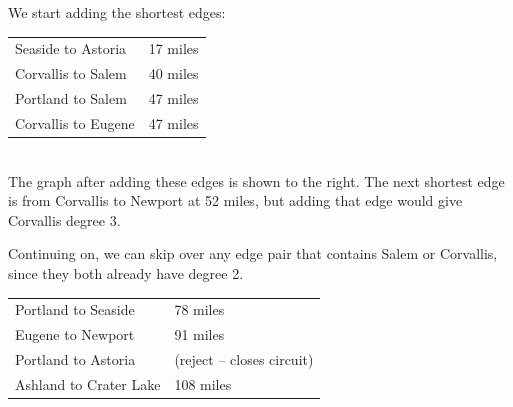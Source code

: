 \begin{example}{}
\begin{minipage}{0.5\textwidth}
We start adding the shortest edges:\\
\begin{tabular}{ll}
Seaside to Astoria&	17 miles\\
Corvallis to Salem	&40 miles\\
Portland to Salem	&47 miles\\
Corvallis to Eugene	&47 miles\\
\end{tabular}\\

The graph after adding these edges is shown to the right.   The next shortest edge is from Corvallis to Newport at 52 miles, but adding that edge would give Corvallis degree 3.  \\
\end{minipage}
%
\begin{minipage}{0.5\textwidth}
\end{minipage}

\begin{minipage}{0.5\textwidth}
Continuing on, we can skip over any edge pair that contains Salem or Corvallis, since they both already have degree 2.\\
\begin{tabular}{ll}
Portland to Seaside& 		78 miles\\
Eugene to Newport	&	91 miles\\
Portland to Astoria	&	(reject -- closes circuit)\\
Ashland to Crater Lake	&108 miles\\
\end{tabular}\\


\end{minipage}
\end{example}
